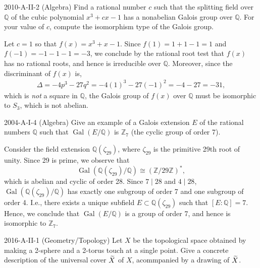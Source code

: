 \documentclass{article}
\begin{document}
\begin{prb}{2010-A-II-2 (Algebra)}
	Find a rational number $c$ such that the splitting field over $\mathbb{Q}$ of the cubic polynomial $x^{3} + cx - 1$ has a nonabelian Galois group over $\mathbb{Q}$. For your value of $c$, compute the isomorphism type of the Galois group. 
\end{prb}
\begin{solutions}
	Let $c = 1$ so that $f(x) = x^{3} + x -1$. Since $f(1) = 1 + 1 - 1 = 1$ and $f(-1) = -1 - 1 -1 = -3$, we conclude by the rational root test that $f(x)$ has no rational roots, and hence is irreducible over $\mathbb{Q}$. Moreover, since the discriminant of $f(x)$ is, 
		\begin{eqnarray}
			\Delta = -4p^{3} -27q^{2} = -4(1)^{3} - 27(-1)^{2} = -4 - 27 = -31, 
		\end{eqnarray}
	which is \textit{not} a square in $\mathbb{Q}$, the Galois group of $f(x)$ over $\mathbb{Q}$ must be isomorphic to $S_{3}$, which is not abelian. 
\end{solutions} 
\begin{prb}{2004-A-I-4 (Algebra)}
	Give an example of a Galois extension $E$ of the rational numbers $\mathbb{Q}$ such that $\operatorname{Gal}(E/\mathbb{Q})$ is $\mathbb{Z}_{7}$ (the cyclic group of order 7). 
\end{prb}
\begin{solutions}
	Consider the field extension $\mathbb{Q}(\zeta_{29})$, where $\zeta_{29}$ is the primitive 29th root of unity. Since 29 is prime, we observe that 
		\begin{equation}
			\operatorname{Gal}(\mathbb{Q}(\zeta_{29})/\mathbb{Q}) \cong \left(\mathbb{Z}/29\mathbb{Z}\right)^{\ast}, 
		\end{equation}
	which is abelian and cyclic of order 28. Since $7 \mid 28$ and $4 \mid 28$, $\operatorname{Gal}(\mathbb{Q}(\zeta_{29})/\mathbb{Q})$ has exactly one subgroup of order 7 and one subgroup of order 4. I.e., there exists a unique subfield $E \subset \mathbb{Q}(\zeta_{29})$ such that $[E: \mathbb{Q}] = 7$. Hence, we conclude that $\operatorname{Gal}(E/\mathbb{Q})$ is a group of order 7, and hence is isomorphic to $\mathbb{Z}_{7}$. 
\end{solutions} 
\begin{prb}{2016-A-II-1 (Geometry/Topology)}
	Let $X$ be the topological space obtained by making a 2-sphere and a 2-torus touch at a single point. Give a concrete description of the universal cover $\widetilde{X}$ of $X$, acommpanied by a drawing of $\widetilde{X}$. 
\end{prb}
\end{document}

